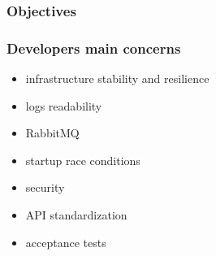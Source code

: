 \documentclass{beamer}
\begin{document}
  \begin{frame}
    \frametitle{Objectives}
  \end{frame}

  \begin{frame}
    \frametitle{Developers main concerns}

    \begin{itemize}
      \item infrastructure stability and resilience
      \item logs readability
      \item RabbitMQ
      \item startup race conditions
      \item security
      \item API standardization
      \item acceptance tests
    \end{itemize}
  \end{frame}
\end{document}
